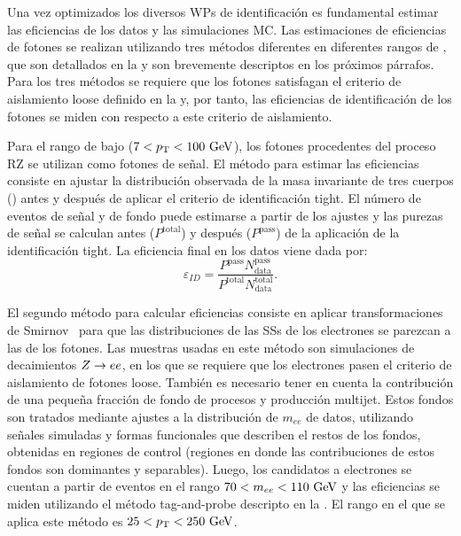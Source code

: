Una vez optimizados los diversos \acp{WP} de identificación es fundamental estimar las eficiencias de los datos y las simulaciones \ac{MC}. Las estimaciones de eficiencias de fotones se realizan utilizando tres métodos diferentes en diferentes rangos de \pt, que son detallados en la  y son brevemente descriptos en los próximos párrafos.
Para los tres métodos se requiere que los fotones satisfagan el criterio de aislamiento loose definido en la \Sect{\ref{subsec:objects:egamma:iso}} y, por tanto, las eficiencias de identificación de los fotones se miden con respecto a este criterio de aislamiento. 

Para el rango de bajo \pt (\(7<p_{\text{T}}<100~\text{GeV}\)), los fotones procedentes del proceso \ac{RZ} se utilizan como fotones de señal. El método para estimar las eficiencias consiste en ajustar la distribución observada de la masa invariante de tres cuerpos (\mlly) antes y después de aplicar el criterio de identificación tight. El número de eventos de señal y de fondo puede estimarse a partir de los ajustes y las purezas de señal se calculan antes (\(P^{\text{total}}\)) y después (\(P^{\text{pass}}\)) de la aplicación de la identificación tight.
La eficiencia final en los datos viene dada por:
\begin{equation*}
    \varepsilon_{ID} = \frac{ P^{\text{pass}} N_{\text{data}}^{\text{pass}} }{ P^{\text{total}} N_{\text{data}}^{\text{total}} }.
\end{equation*}

El segundo método para calcular eficiencias consiste en aplicar transformaciones de Smirnov~\cite{SmirnovTransform} para que las distribuciones de las \acp{SS} de los electrones se parezcan a las de los fotones. Las muestras usadas en este método son simulaciones de decaimientos \(Z\rightarrow ee\), en los que se requiere que los electrones pasen el criterio de aislamiento de fotones loose. También es necesario tener en cuenta la contribución de una peque\~na fracción de fondo de procesos \Wjets y producción multijet. Estos fondos son tratados mediante ajustes a la distribución de \(m_{ee}\) de datos, utilizando señales simuladas y formas funcionales que describen el restos de los fondos, obtenidas en regiones de control (regiones en donde las contribuciones de estos fondos son dominantes y separables). Luego, los candidatos a electrones se cuentan a partir de eventos en el rango \(70 < m_{ee} < 110~\text{GeV}\) y las eficiencias se miden utilizando el método tag-and-probe descripto en la . El rango \pt en el que se aplica este método es \(25<p_{\text{T}}<250~\text{GeV}\).

